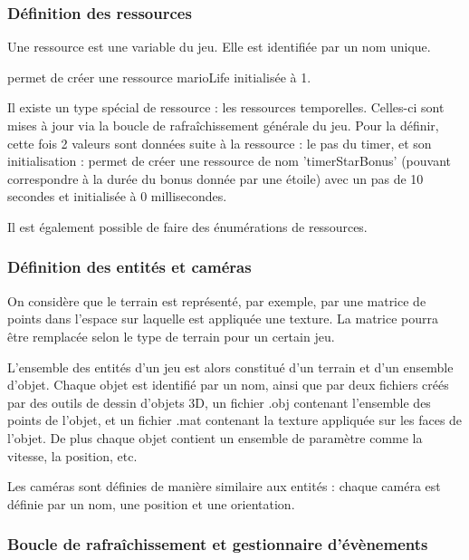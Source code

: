 \subsubsection{Définition des ressources}

Une ressource est une variable du jeu.
Elle est identifiée par un nom unique.

 permet de créer une ressource marioLife initialisée à 1.

Il existe un type spécial de ressource : les ressources temporelles.
Celles-ci sont mises à jour via la boucle de rafraîchissement générale du jeu.
Pour la définir, cette fois 2 valeurs sont données suite à la ressource : le pas du timer, et son initialisation :
 permet de créer une ressource de nom 'timerStarBonus' (pouvant correspondre à la durée du bonus donnée par une étoile)
avec un pas de 10 secondes et initialisée à 0 millisecondes. 

Il est également possible de faire des énumérations de ressources.

\subsubsection{Définition des entités et caméras}

On considère que le terrain est représenté, par exemple, par une matrice de points dans l'espace sur laquelle est appliquée une texture.
La matrice pourra être remplacée selon le type de terrain pour un certain jeu. 

L'ensemble des entités d'un jeu est alors constitué d'un terrain et d'un ensemble d'objet.
Chaque objet est identifié par un nom, ainsi que par deux fichiers créés par des outils de dessin d'objets 3D, un fichier .obj contenant l'ensemble
des points de l'objet, et un fichier .mat contenant la texture appliquée sur les faces de l'objet.
De plus chaque objet contient un ensemble de paramètre comme la vitesse, la position, etc. 

Les caméras sont définies de manière similaire aux entités : chaque caméra est définie par un nom, une position et une orientation.

\subsubsection{Boucle de rafraîchissement et gestionnaire d'évènements}

